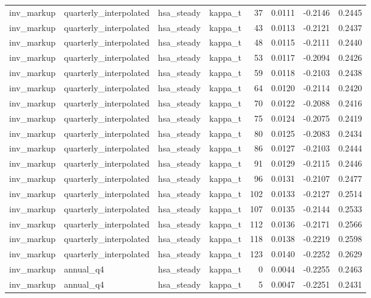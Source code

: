 \begin{tabular}{llllrrrr}
inv\_markup & quarterly\_interpolated & hsa\_steady & kappa\_t & 37 & 0.0111 & -0.2146 & 0.2445 \\
inv\_markup & quarterly\_interpolated & hsa\_steady & kappa\_t & 43 & 0.0113 & -0.2121 & 0.2437 \\
inv\_markup & quarterly\_interpolated & hsa\_steady & kappa\_t & 48 & 0.0115 & -0.2111 & 0.2440 \\
inv\_markup & quarterly\_interpolated & hsa\_steady & kappa\_t & 53 & 0.0117 & -0.2094 & 0.2426 \\
inv\_markup & quarterly\_interpolated & hsa\_steady & kappa\_t & 59 & 0.0118 & -0.2103 & 0.2438 \\
inv\_markup & quarterly\_interpolated & hsa\_steady & kappa\_t & 64 & 0.0120 & -0.2114 & 0.2420 \\
inv\_markup & quarterly\_interpolated & hsa\_steady & kappa\_t & 70 & 0.0122 & -0.2088 & 0.2416 \\
inv\_markup & quarterly\_interpolated & hsa\_steady & kappa\_t & 75 & 0.0124 & -0.2075 & 0.2419 \\
inv\_markup & quarterly\_interpolated & hsa\_steady & kappa\_t & 80 & 0.0125 & -0.2083 & 0.2434 \\
inv\_markup & quarterly\_interpolated & hsa\_steady & kappa\_t & 86 & 0.0127 & -0.2103 & 0.2444 \\
inv\_markup & quarterly\_interpolated & hsa\_steady & kappa\_t & 91 & 0.0129 & -0.2115 & 0.2446 \\
inv\_markup & quarterly\_interpolated & hsa\_steady & kappa\_t & 96 & 0.0131 & -0.2107 & 0.2477 \\
inv\_markup & quarterly\_interpolated & hsa\_steady & kappa\_t & 102 & 0.0133 & -0.2127 & 0.2514 \\
inv\_markup & quarterly\_interpolated & hsa\_steady & kappa\_t & 107 & 0.0135 & -0.2144 & 0.2533 \\
inv\_markup & quarterly\_interpolated & hsa\_steady & kappa\_t & 112 & 0.0136 & -0.2171 & 0.2566 \\
inv\_markup & quarterly\_interpolated & hsa\_steady & kappa\_t & 118 & 0.0138 & -0.2219 & 0.2598 \\
inv\_markup & quarterly\_interpolated & hsa\_steady & kappa\_t & 123 & 0.0140 & -0.2252 & 0.2629 \\
inv\_markup & annual\_q4 & hsa\_steady & kappa\_t & 0 & 0.0044 & -0.2255 & 0.2463 \\
inv\_markup & annual\_q4 & hsa\_steady & kappa\_t & 5 & 0.0047 & -0.2251 & 0.2431 \\

\end{tabular}
